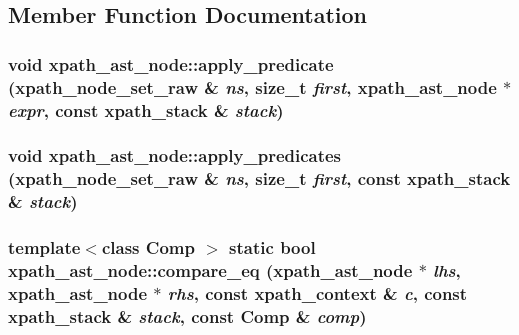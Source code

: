 \subsection{Member Function Documentation}
\hypertarget{classxpath__ast__node_afcefe6b386c214349c5e23f13828fa1e}{
\subsubsection[{apply\_\-predicate}]{\setlength{\rightskip}{0pt plus 5cm}void xpath\_\-ast\_\-node::apply\_\-predicate ({\bf xpath\_\-node\_\-set\_\-raw} \& {\em ns}, \/  size\_\-t {\em first}, \/  {\bf xpath\_\-ast\_\-node} $\ast$ {\em expr}, \/  const {\bf xpath\_\-stack} \& {\em stack})}}
\label{classxpath__ast__node_afcefe6b386c214349c5e23f13828fa1e}
\hypertarget{classxpath__ast__node_ae5e3b5fec836d9478ebd195dda7fdedd}{
\subsubsection[{apply\_\-predicates}]{\setlength{\rightskip}{0pt plus 5cm}void xpath\_\-ast\_\-node::apply\_\-predicates ({\bf xpath\_\-node\_\-set\_\-raw} \& {\em ns}, \/  size\_\-t {\em first}, \/  const {\bf xpath\_\-stack} \& {\em stack})}}
\label{classxpath__ast__node_ae5e3b5fec836d9478ebd195dda7fdedd}
\hypertarget{classxpath__ast__node_a16805022b8f8b8f26061b11d0f8e01b5}{
\subsubsection[{compare\_\-eq}]{\setlength{\rightskip}{0pt plus 5cm}template$<$class Comp $>$ static bool xpath\_\-ast\_\-node::compare\_\-eq ({\bf xpath\_\-ast\_\-node} $\ast$ {\em lhs}, \/  {\bf xpath\_\-ast\_\-node} $\ast$ {\em rhs}, \/  const {\bf xpath\_\-context} \& {\em c}, \/  const {\bf xpath\_\-stack} \& {\em stack}, \/  const Comp \& {\em comp})}}
